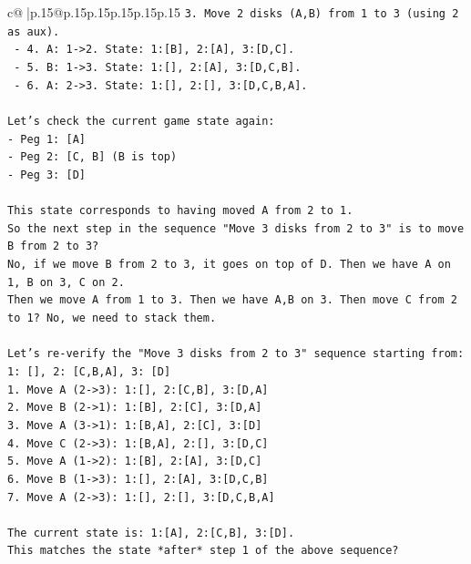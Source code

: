 \documentclass{article}
\begin{document}
{\begin{supertabular}{c@{$\;$}|p{.15\linewidth}@{}p{.15\linewidth}p{.15\linewidth}p{.15\linewidth}p{.15\linewidth}p{.15\linewidth}}
{{{\texttt{3. Move 2 disks (A,B) from 1 to 3 (using 2 as aux).} \\
\texttt{   {-} 4. A: 1{-}>2. State: 1:{[}B{]}, 2:{[}A{]}, 3:{[}D,C{]}.} \\
\texttt{   {-} 5. B: 1{-}>3. State: 1:{[}{]}, 2:{[}A{]}, 3:{[}D,C,B{]}.} \\
\texttt{   {-} 6. A: 2{-}>3. State: 1:{[}{]}, 2:{[}{]}, 3:{[}D,C,B,A{]}.} \\
\\ 
\texttt{Let's check the current game state again:} \\
\texttt{{-} Peg 1: {[}A{]}} \\
\texttt{{-} Peg 2: {[}C, B{]} (B is top)} \\
\texttt{{-} Peg 3: {[}D{]}} \\
\\ 
\texttt{This state corresponds to having moved A from 2 to 1.} \\
\texttt{So the next step in the sequence "Move 3 disks from 2 to 3" is to move B from 2 to 3?} \\
\texttt{No, if we move B from 2 to 3, it goes on top of D. Then we have A on 1, B on 3, C on 2.} \\
\texttt{Then we move A from 1 to 3. Then we have A,B on 3. Then move C from 2 to 1? No, we need to stack them.} \\
\\ 
\texttt{Let's re{-}verify the "Move 3 disks from 2 to 3" sequence starting from:} \\
\texttt{1: {[}{]}, 2: {[}C,B,A{]}, 3: {[}D{]}} \\
\texttt{1. Move A (2{-}>3): 1:{[}{]}, 2:{[}C,B{]}, 3:{[}D,A{]}} \\
\texttt{2. Move B (2{-}>1): 1:{[}B{]}, 2:{[}C{]}, 3:{[}D,A{]}} \\
\texttt{3. Move A (3{-}>1): 1:{[}B,A{]}, 2:{[}C{]}, 3:{[}D{]}} \\
\texttt{4. Move C (2{-}>3): 1:{[}B,A{]}, 2:{[}{]}, 3:{[}D,C{]}} \\
\texttt{5. Move A (1{-}>2): 1:{[}B{]}, 2:{[}A{]}, 3:{[}D,C{]}} \\
\texttt{6. Move B (1{-}>3): 1:{[}{]}, 2:{[}A{]}, 3:{[}D,C,B{]}} \\
\texttt{7. Move A (2{-}>3): 1:{[}{]}, 2:{[}{]}, 3:{[}D,C,B,A{]}} \\
\\ 
\texttt{The current state is: 1:{[}A{]}, 2:{[}C,B{]}, 3:{[}D{]}.} \\
\texttt{This matches the state *after* step 1 of the above sequence?} \\
}}}
\end{supertabular}}
\end{document}
